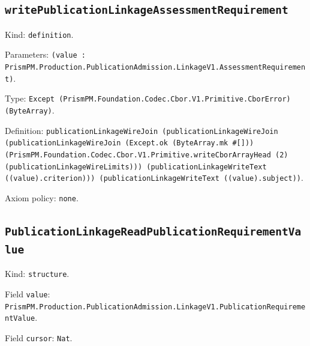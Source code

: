 \documentclass[11pt]{article}
\begin{document}
\subsection*{\texttt{writePublicationLinkageAssessmentRequirement}}
\noindent Kind: \texttt{definition}.\par
\noindent Parameters: \texttt{(value : PrismPM.Production.PublicationAdmission.LinkageV1.AssessmentRequirement)}.\par
\noindent Type: \texttt{Except (PrismPM.Foundation.Codec.Cbor.V1.Primitive.CborError) (ByteArray)}.\par
\noindent Definition: \texttt{publicationLinkageWireJoin (publicationLinkageWireJoin (publicationLinkageWireJoin (Except.ok (ByteArray.mk \#[])) (PrismPM.Foundation.Codec.Cbor.V1.Primitive.writeCborArrayHead (2) (publicationLinkageWireLimits))) (publicationLinkageWriteText ((value).criterion))) (publicationLinkageWriteText ((value).subject))}.\par
\noindent Axiom policy: \texttt{none}.\par
\subsection*{\texttt{PublicationLinkageReadPublicationRequirementValue}}
\noindent Kind: \texttt{structure}.\par
\noindent Field \texttt{value}: \texttt{PrismPM.Production.PublicationAdmission.LinkageV1.PublicationRequirementValue}.\par
\noindent Field \texttt{cursor}: \texttt{Nat}.\par
\end{document}
